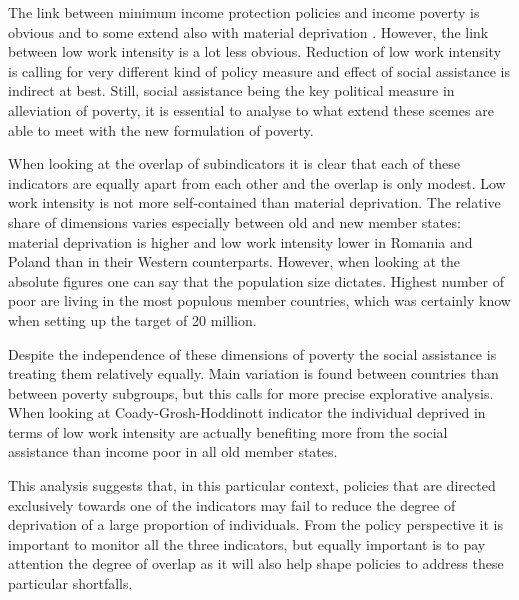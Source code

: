 \documentclass[11pt, a4paper]{article}\usepackage{graphicx, color}
\begin{document}
The link between minimum income protection policies and income poverty is obvious and to some extend also with material deprivation \citep{nelson_counteracting_2012}. However, the link between low work intensity is a lot less obvious. Reduction of low work intensity is calling for very different kind of policy measure and effect of social assistance is indirect at best. Still, social assistance being the key political measure in alleviation of poverty, it is essential to analyse to what extend these scemes are able to meet with the new formulation of poverty.

When looking at the overlap of subindicators it is clear that each of these indicators are equally apart from each other and the overlap is only modest. Low work intensity is not more self-contained than material deprivation. The relative share of dimensions varies especially between old and new member states: material deprivation is higher and low work intensity lower in Romania and Poland than in their Western counterparts. However, when looking at the absolute figures one can say that the population size dictates. Highest number of poor are living in the most populous member countries, which was certainly know when setting up the target of 20 million.

Despite the independence of these dimensions of poverty the social assistance is treating them relatively equally. Main variation is found between countries than between poverty subgroups, but this calls for more precise explorative analysis. When looking at Coady-Grosh-Hoddinott indicator the individual deprived in terms of low work intensity are actually benefiting more from the social assistance than income poor in all old member states. 

This analysis suggests that, in this particular context, policies that are directed exclusively towards one of the indicators may fail to reduce the degree of deprivation of a large proportion of individuals. From the policy perspective it is important to monitor all the three indicators, but equally important is to pay attention the degree of overlap as it will also help shape policies to address these particular shortfalls.







\end{document}
